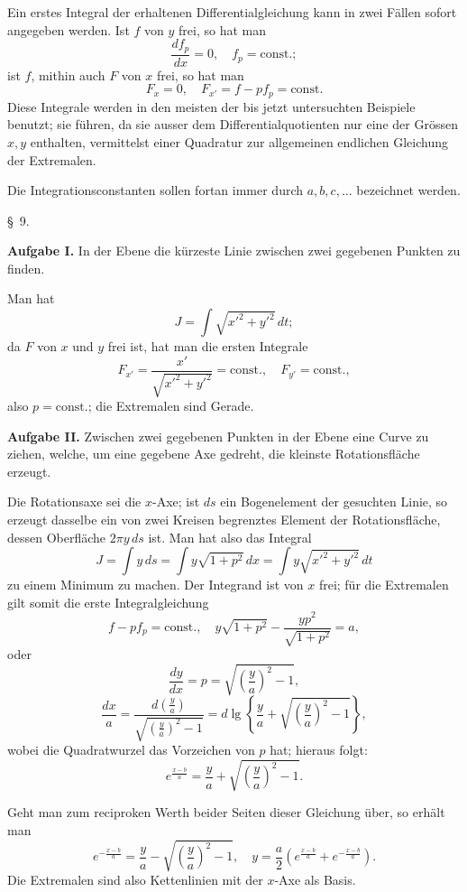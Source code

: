 \documentclass[11pt,a4paper,leqno]{article}
\providecommand{\lg}{\operatorname{lg}}
\begin{document}
Ein erstes Integral der erhaltenen Differentialgleichung kann in zwei Fällen sofort angegeben werden. Ist $f$ von $y$ frei, so hat man
\[
\frac{df_p}{dx}=0,\quad f_p=\mathrm{const.};
\]
ist $f$, mithin auch $F$ von $x$ frei, so hat man
\[
F_x=0,\quad F_{x'}=f-pf_p=\mathrm{const.}
\]
Diese Integrale werden in den meisten der bis jetzt untersuchten Beispiele benutzt; sie führen, da sie ausser dem Differentialquotienten nur eine der Grössen $x,y$ enthalten, vermittelst einer Quadratur zur allgemeinen endlichen Gleichung der Extremalen.

Die Integrationsconstanten sollen fortan immer durch $a,b,c,\ldots$ bezeichnet werden.

\begin{center}{\large \S~9.}\end{center}

\noindent\textbf{Aufgabe I.} In der Ebene die kürzeste Linie zwischen zwei gegebenen Punkten zu finden.

Man hat
\[
J=\int \sqrt{x'^2+y'^2}\,dt;
\]
da $F$ von $x$ und $y$ frei ist, hat man die ersten Integrale
\[
F_{x'}=\frac{x'}{\sqrt{x'^2+y'^2}}=\mathrm{const.},\quad F_{y'}=\mathrm{const.},
\]
also $p=\mathrm{const.}$; die Extremalen sind Gerade.

\medskip
\noindent\textbf{Aufgabe II.} Zwischen zwei gegebenen Punkten in der Ebene eine Curve zu ziehen, welche, um eine gegebene Axe gedreht, die kleinste Rotationsfläche erzeugt.

Die Rotationsaxe sei die $x$-Axe; ist $ds$ ein Bogenelement der gesuchten Linie, so erzeugt dasselbe ein von zwei Kreisen begrenztes Element der Rotationsfläche, dessen Oberfläche $2\pi y\,ds$ ist. Man hat also das Integral
\[
J=\int y\,ds=\int y\sqrt{1+p^2}\,dx=\int y\sqrt{x'^2+y'^2}\,dt
\]
zu einem Minimum zu machen. Der Integrand ist von $x$ frei; für die Extremalen gilt somit die erste Integralgleichung
\[
f-pf_p=\mathrm{const.},\quad y\sqrt{1+p^2}-\frac{yp^2}{\sqrt{1+p^2}}=a,
\]
oder
\[
\frac{dy}{dx}=p=\sqrt{\left(\frac{y}{a}\right)^2-1},
\]
\[
\frac{dx}{a}=\frac{d\left(\frac{y}{a}\right)}{\sqrt{\left(\frac{y}{a}\right)^2-1}}=d\lg\left\{\frac{y}{a}+\sqrt{\left(\frac{y}{a}\right)^2-1}\right\},
\]
wobei die Quadratwurzel das Vorzeichen von $p$ hat; hieraus folgt:
\[
e^{\frac{x-b}{a}}=\frac{y}{a}+\sqrt{\left(\frac{y}{a}\right)^2-1}.
\]

Geht man zum reciproken Werth beider Seiten dieser Gleichung über, so erhält man
\[
e^{-\frac{x-b}{a}}=\frac{y}{a}-\sqrt{\left(\frac{y}{a}\right)^2-1},\quad
y=\frac{a}{2}\left(e^{\frac{x-b}{a}}+e^{-\frac{x-b}{a}}\right).
\]
Die Extremalen sind also Kettenlinien mit der $x$-Axe als Basis.
\end{document}
